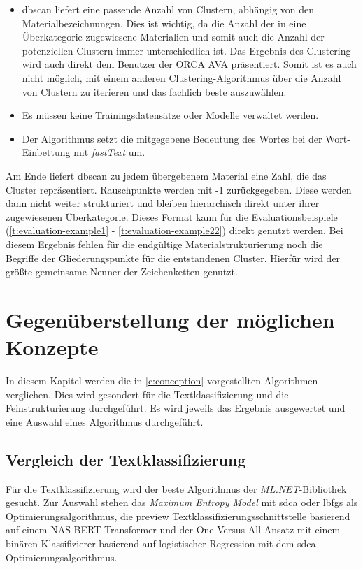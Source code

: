 \begin{itemize}
	\item \ac{dbscan} liefert eine passende Anzahl von Clustern, abhängig von den Materialbezeichnungen. Dies ist wichtig, da die Anzahl der in eine Überkategorie zugewiesene Materialien und somit auch die Anzahl der potenziellen Clustern immer unterschiedlich ist. Das Ergebnis des Clustering wird auch direkt dem Benutzer der ORCA AVA präsentiert. Somit ist es auch nicht möglich, mit einem anderen Clustering-Algorithmus über die Anzahl von Clustern zu iterieren und das fachlich beste auszuwählen.
	\item Es müssen keine Trainingsdatensätze oder Modelle verwaltet werden.
	\item Der Algorithmus setzt die mitgegebene Bedeutung des Wortes bei der Wort-Einbettung mit \textit{fastText} um. 
\end{itemize}

Am Ende liefert \ac{dbscan} zu jedem übergebenem Material eine Zahl, die das Cluster repräsentiert. Rauschpunkte werden mit -1 zurückgegeben. Diese werden dann nicht weiter strukturiert und bleiben hierarchisch direkt unter ihrer zugewiesenen Überkategorie. Dieses Format kann für die Evaluationsbeispiele (\autoref{t:evaluation-example1} - \autoref{t:evaluation-example22}) direkt genutzt werden. Bei diesem Ergebnis fehlen für die endgültige Materialstrukturierung noch die Begriffe der Gliederungspunkte für die entstandenen Cluster. Hierfür wird der größte gemeinsame Nenner der Zeichenketten genutzt.

\chapter{Gegenüberstellung der möglichen Konzepte}
\label{c:comparison}
In diesem Kapitel werden die in \autoref{c:conception} vorgestellten Algorithmen verglichen.
Dies wird gesondert für die Textklassifizierung und die Feinstrukturierung durchgeführt. Es wird jeweils das Ergebnis ausgewertet und eine Auswahl eines Algorithmus durchgeführt.
\section{Vergleich der Textklassifizierung}
\label{c:comparison:classification}
Für die Textklassifizierung wird der beste Algorithmus der \textit{ML.NET}-Bibliothek gesucht. Zur Auswahl stehen das \textit{Maximum Entropy Model} mit \ac{sdca} oder \ac{lbfgs} als Optimierungsalgorithmus, die preview Textklassifizierungsschnittstelle basierend auf einem NAS-BERT Transformer und der One-Versus-All Ansatz mit einem binären Klassifizierer basierend auf logistischer Regression mit dem \ac{sdca} Optimierungsalgorithmus.

